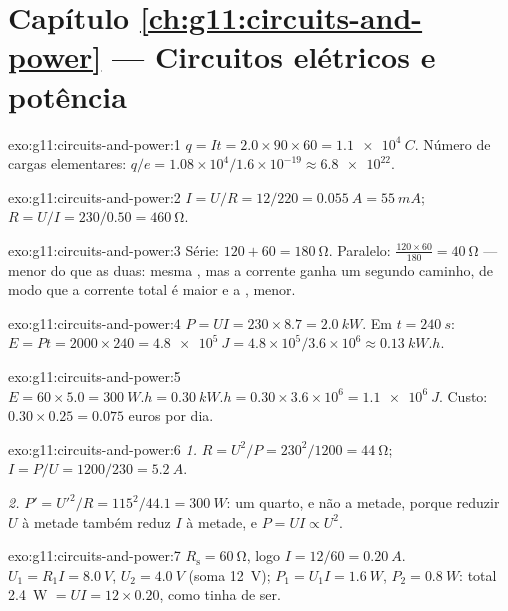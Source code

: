 \section*{Capítulo \ref{ch:g11:circuits-and-power} --- Circuitos elétricos e potência}

\begin{solution}{exo:g11:circuits-and-power:1}
$q = It = 2.0 \times 90 \times 60 = \qty{1.1e4}{C}$. Número de cargas
elementares:
$q/e = 1.08\times10^{4}/1.6\times10^{-19} \approx \num{6.8e22}$.
\end{solution}

\begin{solution}{exo:g11:circuits-and-power:2}
$I = U/R = 12/220 = \qty{0.055}{A} = \qty{55}{mA}$;
$R = U/I = 230/0.50 = \qty{460}{\ohm}$.
\end{solution}

\begin{solution}{exo:g11:circuits-and-power:3}
Série: $120 + 60 = \qty{180}{\ohm}$. Paralelo:
$\frac{120 \times 60}{180} = \qty{40}{\ohm}$ --- menor do que as duas:
mesma , mas a corrente ganha um segundo caminho, de modo que a
corrente total é maior e a , menor.
\end{solution}

\begin{solution}{exo:g11:circuits-and-power:4}
$P = UI = 230 \times 8.7 = \qty{2.0}{kW}$. Em $t = \qty{240}{s}$:
$E = Pt = 2000 \times 240 = \qty{4.8e5}{J} = 4.8\times10^{5}/3.6
\times10^{6} \approx \qty{0.13}{kW.h}$.
\end{solution}

\begin{solution}{exo:g11:circuits-and-power:5}
$E = 60 \times 5.0 = \qty{300}{W.h} = \qty{0.30}{kW.h} = 0.30 \times
3.6\times10^{6} = \qty{1.1e6}{J}$. Custo:
$0.30 \times 0.25 = 0.075$ euros por dia.
\end{solution}

\begin{solution}{exo:g11:circuits-and-power:6}
\emph{1.} $R = U^2/P = 230^2/1200 = \qty{44}{\ohm}$;
$I = P/U = 1200/230 = \qty{5.2}{A}$.

\emph{2.} $P' = U'^2/R = 115^2/44.1 = \qty{300}{W}$: um quarto, e não a
metade, porque reduzir $U$ à metade também reduz $I$ à metade, e
$P = UI \propto U^2$.
\end{solution}

\begin{solution}{exo:g11:circuits-and-power:7}
$R_{\text{s}} = \qty{60}{\ohm}$, logo $I = 12/60 = \qty{0.20}{A}$.
$U_1 = R_1 I = \qty{8.0}{V}$, $U_2 = \qty{4.0}{V}$ (soma \qty{12}{V});
$P_1 = U_1 I = \qty{1.6}{W}$, $P_2 = \qty{0.8}{W}$: total \qty{2.4}{W}
$= UI = 12 \times 0.20$, como tinha de ser.
\end{solution}

